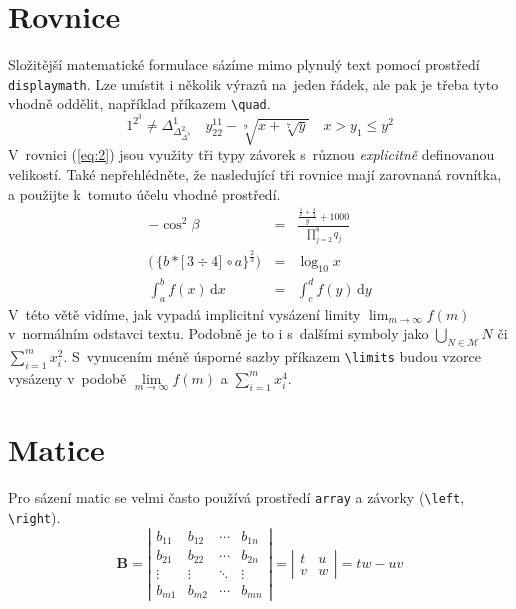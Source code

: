 \documentclass[11pt,a4paper, twocolumn]{article}
\theoremstyle{definition}
\theoremstyle{definition}
\begin{document}
\section{Rovnice}\label{sec:Rovnice}
Složitější matematické formulace sázíme mimo plynulý text pomocí prostředí \verb|displaymath|. Lze umístit i několik výrazů na~jeden řádek, ale pak je třeba tyto vhodně oddělit, například příkazem \verb|\quad|. 
\begin{displaymath} 
1^{2^3} \neq \Delta^1_{\Delta^2_{\Delta^3}} 
\quad  
y^{11}_{22} - \sqrt[9]{x+\sqrt[7]{y}}
\quad
x > y_1 \leq y^2
\end{displaymath}
V~rovnici (\ref{eq:2}) jsou využity tři typy závorek s~různou \emph{explicitně} definovanou velikostí. Také nepřehlédněte, že nasledující tři rovnice mají zarovnaná rovnítka, a použijte k~tomuto účelu vhodné prostředí. 
\begin{eqnarray}
-\cos^2\beta &=& \frac{\frac{\frac{1}{x} + \frac{1}{3}}{y} + 1000}{\prod\limits^8_{j=2} q_j} \label{eq:1} \\  
\bigg(\, \Big\{ b * \big[\, 3 \div 4 \big]\, \circ a \Big\}^{\frac{2}{3}} \bigg)\, &=& \log_{10}x  \label{eq:2} \\
\int_a^b f(x)\,\mathrm{d}x &=& \int_c^d f(y)\,\mathrm{d}y \label{eq:3}
\end{eqnarray}
V~této větě vidíme, jak vypadá implicitní vysázení limity ${ \lim_{m \to \infty} f(m) }$ v~normálním odstavci textu. Podobně je to i s~dalšími symboly jako ${ \bigcup_{N \in \mathcal{M}} N }$ či ${ \sum_{i=1}^m x_i^2 }$. S~vynucením méně úsporné sazby příkazem \verb|\limits| budou vzorce vysázeny v~podobě ${ \lim\limits_{m \to \infty} f(m) }$ a $ \sum\limits_{i=1}^m x_i^4 $. 

\section{Matice}\label{sec:Matice}
Pro sázení matic se velmi často používá prostředí \verb|array| a závorky (\verb|\left|, \verb|\right|). 
\begin{displaymath}
    \textbf{B} =
    \left|
    \begin{array}{cccc}
       b_{11} & b_{12} &  \cdots & b_{1n} \\
       b_{21} & b_{22} &  \cdots  & b_{2n} \\
       \vdots  & \vdots  & \ddots  &  \vdots \\
       b_{m1} & b_{m2} &  \cdots & b_{mn}
    \end{array}
    \right|
    =
    \left|
    \begin{array}{cc}
       t & u \\
       v & w 
    \end{array}
    \right|
    = tw - uv
\end{displaymath}
\end{document}
